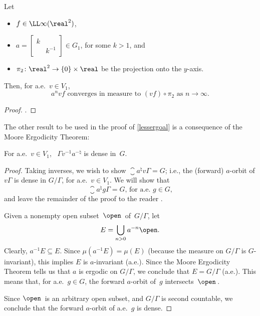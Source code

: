 \begin{cor} \label{LebConvMeasToProj}
Let
\noprelistbreak
\begin{itemize}
\item $f \in \LL\infty(\real^2)$,
\item $a = \begin{bmatrix} k & \\ &k^{-1} \end{bmatrix} \in G_1$, for some $k > 1$,
and
\item $\pi_2 \colon \real^2 \to \{0\}\times \real$ be the projection onto the $y$-axis.
\end{itemize}
Then, for a.e.\ $v \in V_1$,
	$$ \text{$a^n v f$ converges in measure to $(vf) \circ \pi_2$ as $n \to \infty$} . $$
\end{cor}

\begin{proof}
.
\end{proof}

The other result to be used in the proof of \cref{lessergoal} is a consequence of the Moore Ergodicity Theorem:

\begin{prop} \label{GammaVADense}
For a.e.\ $v \in V_1$, \ $\Gamma v^{-1} a^{-\natural}$ is dense in~$G$.
\end{prop}

\begin{proof}
Taking inverses, we wish to show $\closure{a^{\natural} v \Gamma} = G$; 
i.e., the (forward) $a$-orbit of $v \Gamma$ is dense in $G/\Gamma$, for a.e.\ $v \in V_1$.
We will show that 
	$$ \text{$\closure{a^{\natural} g \Gamma} = G$, for a.e.\ $g \in G$,} $$
and leave the remainder of the proof to the reader .

Given a nonempty open subset~$\open$\, of~$G/\Gamma$,
let 
	$$E = \bigcup_{n>0} a^{-n} \open .$$
Clearly, $a^{-1} E \subseteq E$. Since $\mu(a^{-1} E) = \mu(E)$ (because the measure on $G/\Gamma$ is $G$-invariant), this implies
	 $E$ is $a$-invariant (a.e.).
Since the Moore Ergodicity Theorem  tells us that $a$ is ergodic on $G/\Gamma$, 
we conclude that $E = G/\Gamma$ (a.e.). This means that, for a.e.\ $g \in G$, the forward $a$-orbit of~$g$ intersects~$\open$\,. 

Since $\open$\, is an arbitrary open subset, and $G/\Gamma$ is second countable, we conclude that the forward $a$-orbit of a.e.~$g$ is dense.
\end{proof}

